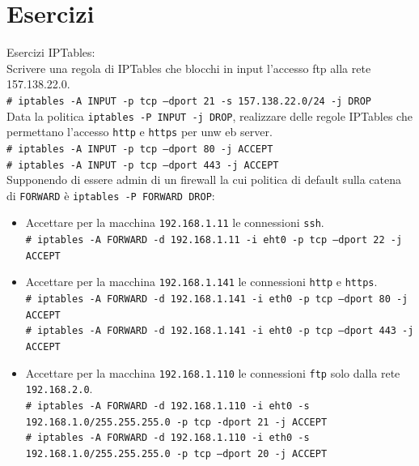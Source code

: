 \documentclass[a4paper]{report}
\newcommand\tab[1][1cm]{\hspace*{#1}}
\begin{document}
\chapter{Esercizi}
Esercizi IPTables:\\
Scrivere una regola di IPTables che blocchi in input l'accesso ftp alla rete 157.138.22.0.\\
\texttt{\tab\# iptables -A INPUT -p tcp --dport 21 -s 157.138.22.0/24 -j DROP}\\
Data la politica \texttt{iptables -P INPUT -j DROP}, realizzare delle regole IPTables che permettano l'accesso \texttt{http} e \texttt{https} per unw eb server.\\
\texttt{\tab\# iptables -A INPUT -p tcp --dport 80 -j ACCEPT\\\tab\# iptables -A INPUT -p tcp --dport 443 -j ACCEPT}\\
Supponendo di essere admin di un firewall la cui politica di default sulla catena di \texttt{FORWARD} è \texttt{iptables -P FORWARD DROP}:\\
\begin{itemize}
\item Accettare per la macchina \texttt{192.168.1.11} le connessioni \texttt{ssh}.\\\texttt{\tab\# iptables -A FORWARD -d 192.168.1.11 -i eht0 -p tcp --dport 22 -j ACCEPT}
\item Accettare per la macchina \texttt{192.168.1.141} le connessioni \texttt{http} e \texttt{https}.\\\texttt{\tab\# iptables -A FORWARD -d 192.168.1.141 -i eth0 -p tcp --dport 80 -j ACCEPT\\\tab\# iptables -A FORWARD -d 192.168.1.141 -i eht0 -p tcp --dport 443 -j ACCEPT}
\item Accettare per la macchina \texttt{192.168.1.110} le connessioni \texttt{ftp} solo dalla rete \texttt{192.168.2.0}.\\\texttt{\tab\# iptables -A FORWARD -d 192.168.1.110 -i eht0 -s 192.168.1.0/255.255.255.0 -p tcp -dport 21 -j ACCEPT\\\tab\# iptables -A FORWARD -d 192.168.1.110 -i eth0 -s 192.168.1.0/255.255.255.0 -p tcp --dport 20 -j ACCEPT}
\end{itemize}
\end{document}
